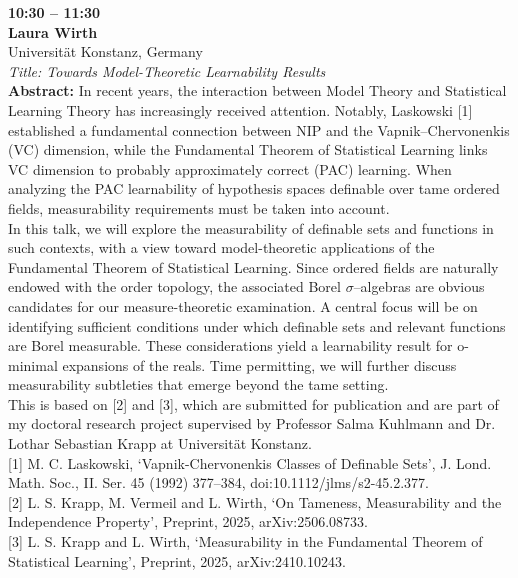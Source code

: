 \documentclass[10pt,a4paper]{article}
\begin{document}
\begin{tcolorbox}[talkbox]
\textbf{10:30 -- 11:30} \\
\textbf{Laura Wirth} \\
Universität Konstanz, Germany \\
\textit{Title: Towards Model-Theoretic Learnability Results} \\
\textbf{Abstract:} In recent years, the interaction between Model Theory and Statistical Learning Theory has increasingly received attention. Notably, Laskowski [1] established a fundamental connection between NIP and the Vapnik--Chervonenkis (VC) dimension, while the Fundamental Theorem of Statistical Learning links VC dimension to probably approximately correct (PAC) learning. When analyzing the PAC learnability of hypothesis spaces definable over tame ordered fields, measurability requirements must be taken into account. \\
					
In this talk, we will explore the measurability of definable sets and functions in such contexts, with a view toward model-theoretic applications of the Fundamental Theorem of Statistical Learning. Since ordered fields are naturally endowed with the order topology, the associated Borel $\sigma$--algebras are obvious candidates for our measure-theoretic examination. A central focus will be on identifying sufficient conditions under which definable sets and relevant functions are Borel measurable. These considerations yield a learnability result for o-minimal expansions of the reals. Time permitting, we will further discuss measurability subtleties that emerge beyond the tame setting.\\

This is based on [2] and [3], which are submitted for publication and are part of my doctoral research project supervised by Professor Salma Kuhlmann and Dr. Lothar Sebastian Krapp at Universität Konstanz.\\
							
[1] M. C. Laskowski, `Vapnik-Chervonenkis Classes of Definable Sets', J. Lond. Math. Soc., II. Ser. 45 (1992) 377–384, doi:10.1112/jlms/s2-45.2.377. \\

[2] L. S. Krapp, M. Vermeil and L. Wirth, `On Tameness, Measurability and the Independence Property', Preprint, 2025, arXiv:2506.08733. \\

[3] L. S. Krapp and L. Wirth, `Measurability in the Fundamental Theorem of Statistical Learning', Preprint, 2025, arXiv:2410.10243.

\end{tcolorbox}
\end{document}

